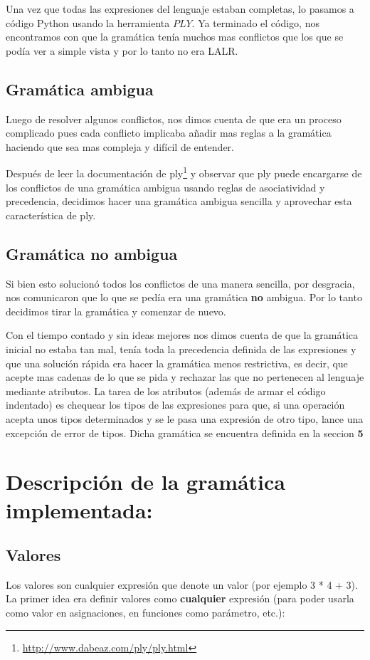 Una vez que todas las expresiones del lenguaje estaban completas, lo pasamos a código Python usando la herramienta $PLY$. Ya terminado el código, nos encontramos con que la gramática tenía muchos mas conflictos que los que se podía ver a simple vista y por lo tanto no era LALR. 

\subsection{Gramática ambigua}

Luego de resolver algunos conflictos, nos dimos cuenta de que era un proceso complicado pues cada conflicto implicaba añadir mas reglas a la gramática haciendo que sea mas compleja y difícil de entender.

Después de leer la documentación de ply\footnote{ \url{http://www.dabeaz.com/ply/ply.html}} y observar que ply puede encargarse de los conflictos de una gramática ambigua usando reglas de asociatividad y precedencia, decidimos hacer una gramática ambigua sencilla y aprovechar esta característica de ply.

\subsection{Gramática no ambigua}

Si bien esto solucionó todos los conflictos de una manera sencilla, por desgracia, nos comunicaron que lo que se pedía era una gramática \textbf{no} ambigua. Por lo tanto decidimos tirar la gramática y comenzar de nuevo.

Con el tiempo contado y sin ideas mejores nos dimos cuenta de que la gramática inicial no estaba tan mal, tenía toda la precedencia definida de las expresiones y que una solución rápida era hacer la gramática menos restrictiva, es decir, que acepte mas cadenas de lo que se pida y rechazar las que no pertenecen al lenguaje mediante atributos. La tarea de los atributos (además de armar el código indentado) es chequear los tipos de las expresiones para que, si una operación acepta unos tipos determinados y se le pasa una expresión de otro tipo, lance una excepción de error de tipos. Dicha gramática se encuentra definida en la seccion \textbf{5}

\section{Descripción de la gramática implementada:}

\subsection{Valores}
Los valores son cualquier expresión que denote un valor (por ejemplo 3 * 4 + 3). La primer idea era definir valores como \textbf{cualquier} expresión (para poder usarla como valor en asignaciones, en funciones como parámetro, etc.):


